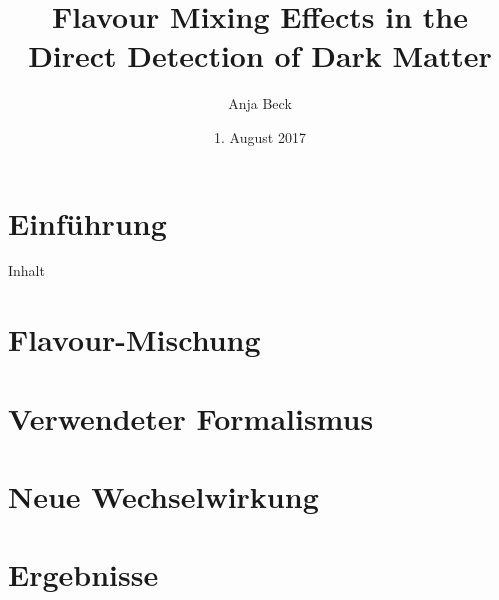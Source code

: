 \documentclass{beamer}
\title{Flavour Mixing Effects in the Direct Detection of Dark Matter}
\author{Anja Beck}
\date{1. August 2017}
\institute{Technische Universität Dortmund}
\begin{document}
\begin{frame}[
	noframenumbering]
	\titlepage
\end{frame}

\section{Einführung}


\begin{frame}{Inhalt}
\framesubtitle{}
\tableofcontents
\end{frame}

\section{Flavour-Mischung}

\section{Verwendeter Formalismus}

\section{Neue Wechselwirkung}

\section{Ergebnisse}


\end{document}
